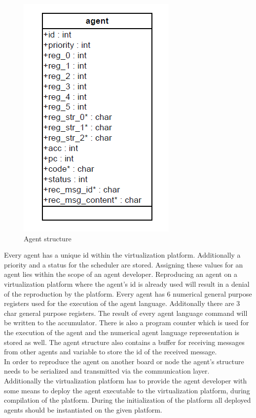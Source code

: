 \documentclass{scrreprt}
\begin{document}
\begin{figure}[!htbp]
\begin{center}
\includegraphics[scale=0.4]{figures/agent.png}
\caption{Agent structure}
\end{center}
\label{agent}
\end{figure}

Every agent has a unique id within the virtualization platform. Additionally a priority and a status for the
scheduler are stored. Assigning these values for an agent lies within the scope of an agent developer. 
Reproducing an agent on a virtualization platform where the agent’s id is already used will result in a denial 
of the reproduction by the platform. Every agent has 6 numerical general purpose registers used for the execution
of the agent language. Additonally there are 3 char general purpose registers. The result of every agent language 
command will be written to the accumulator. There is also a program counter which is used for the execution of the
agent and the numerical agent language representation is stored as well. The agent structure also contains a buffer
for receiving messages from other agents and variable to store the id of the received message.
\newline
\\
\noindent
In order to reproduce the agent on another board or node the agent’s structure needs to be serialized and transmitted via the communication layer.
\newline
\\
\noindent
Additionally the virtualization platform has to provide the agent developer with some means to deploy the agent
executable to the virtualization platform, during compilation of the platform. During the initialization of the
platform all deployed agents should be instantiated on the given platform.
\end{document}
